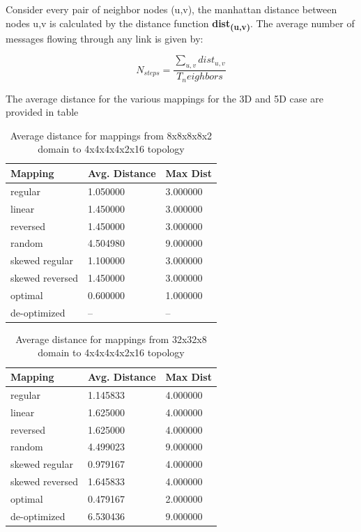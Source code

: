 \documentclass{acm_proc_article-sp}
\begin{document}
Consider every pair of neighbor nodes (u,v), the manhattan distance between nodes u,v is calculated by the distance function \textbf{dist\textsubscript{(u,v)}}.
The average number of messages flowing through any link is given by:

\begin{equation}
  N_{steps} = \frac{ \sum\limits_{u,v} dist_{u,v} } {T_neighbors}
\end{equation}

The average distance for the various mappings for the 3D and 5D case are provided in table


\begin{table}
  \caption{Average distance for mappings from 8x8x8x8x2 domain to 4x4x4x4x2x16 topology}
  {\footnotesize
    \begin{tabular}{| l | l | p{1.5cm} |}
    \hline
    Mapping         & Avg. Distance & Max Dist\\ \hline
    regular         & 1.050000 & 3.000000\\ \hline
    linear          & 1.450000 & 3.000000\\ \hline
    reversed        & 1.450000 & 3.000000\\ \hline
    random          & 4.504980 & 9.000000\\ \hline
    skewed regular  & 1.100000 & 3.000000\\ \hline
    skewed reversed & 1.450000 & 3.000000\\ \hline
    optimal         & 0.600000 & 1.000000\\ \hline
    de-optimized    & --       & --      \\ \hline
    \hline
    \end{tabular}
  }
\end{table}


\begin{table}
  \caption{Average distance for mappings from 32x32x8 domain to 4x4x4x4x2x16 topology}
  {\footnotesize
    \begin{tabular}{| l | l | p{1.5cm} |}
    \hline
    Mapping         & Avg. Distance & Max Dist\\ \hline
    regular         & 1.145833 & 4.000000\\ \hline
    linear          & 1.625000 & 4.000000\\ \hline
    reversed        & 1.625000 & 4.000000\\ \hline
    random          & 4.499023 & 9.000000\\ \hline
    skewed regular  & 0.979167 & 4.000000\\ \hline
    skewed reversed & 1.645833 & 4.000000\\ \hline
    optimal         & 0.479167 & 2.000000\\ \hline
    de-optimized    & 6.530436 & 9.000000\\ \hline
    \hline
    \end{tabular}
  }
\end{table}
\end{document}
